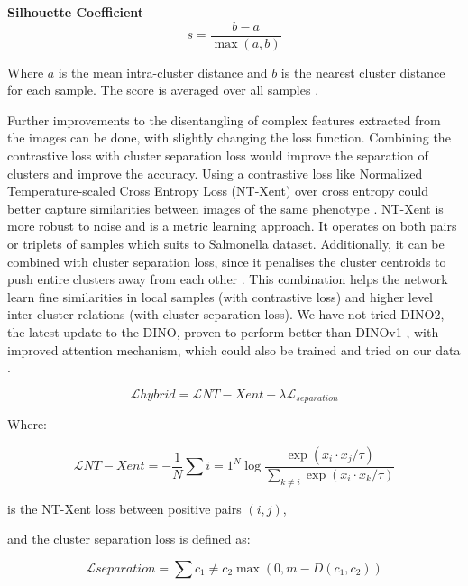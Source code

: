 \documentclass[12pt,a4paper]{article}
\begin{document}

\textbf{Silhouette Coefficient}
\begin{equation}
s = \frac{b-a}{\max(a,b)}
\end{equation}

Where $a$ is the mean intra-cluster distance and $b$ is the nearest cluster distance for each sample. The score is averaged over all samples \cite{silhouettecoefficient}.


Further improvements to the disentangling of complex features extracted from the images can be done, with slightly changing the loss function. Combining the contrastive loss with cluster separation loss would improve the separation of clusters and improve the accuracy. Using a contrastive loss like Normalized Temperature-scaled Cross Entropy Loss (NT-Xent) over cross entropy could better capture similarities between images of the same phenotype \cite{koch2015siamese}. NT-Xent is more robust to noise and is a metric learning approach. It operates on both pairs or triplets of samples which suits to Salmonella dataset. Additionally, it can be combined with cluster separation loss, since it penalises the cluster centroids to push entire clusters away from each other \cite{xu2018variational}. This combination helps the network learn fine similarities in local samples (with contrastive loss) and higher level inter-cluster relations (with cluster separation loss). We have not tried DINO2, the latest update to the DINO, proven to perform better than DINOv1 \cite{caron2021emerging}, with improved attention mechanism, which could also be trained and tried on our data \cite{chen2023dinov2}.

\begin{equation}
\mathcal{L}{hybrid} = \mathcal{L}{NT-Xent} + \lambda \mathcal{L}_{separation}
\end{equation}

Where:

\begin{equation}
\mathcal{L}{NT-Xent} = - \frac{1}{N} \sum{i=1}^N \log \frac{\exp(x_i \cdot x_j / \tau)}{\sum_{k \neq i} \exp(x_i \cdot x_k / \tau)}
\end{equation}

is the NT-Xent loss between positive pairs $(i,j)$,

and the cluster separation loss is defined as:

\begin{equation}
\mathcal{L}{separation} = \sum{c_1 \neq c_2} \max(0, m - D(c_1, c_2))
\end{equation}
\end{document}
